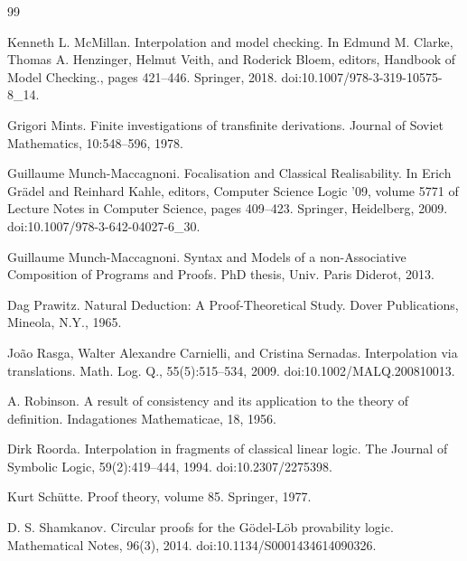 \begin{thebibliography}{99}
\par\noindent    Kenneth L. McMillan.  Interpolation and model checking.  In Edmund M. Clarke, Thomas A. Henzinger, Helmut Veith, and Roderick Bloem, editors, Handbook of Model Checking., pages 421–446. Springer, 2018.  doi:10.1007/978-3-319-10575-8\_14.  

\par\noindent    Grigori Mints.  Finite investigations of transfinite derivations.  Journal of Soviet Mathematics, 10:548–596, 1978.  

\par\noindent    Guillaume Munch-Maccagnoni.  Focalisation and Classical Realisability.  In Erich Grädel and Reinhard Kahle, editors, Computer Science Logic ’09, volume 5771 of Lecture Notes in Computer Science, pages 409–423. Springer, Heidelberg, 2009.  doi:10.1007/978-3-642-04027-6\_30.  

\par\noindent    Guillaume Munch-Maccagnoni.  Syntax and Models of a non-Associative Composition of Programs and Proofs.  PhD thesis, Univ. Paris Diderot, 2013.  

\par\noindent    Dag Prawitz.  Natural Deduction: A Proof-Theoretical Study.  Dover Publications, Mineola, N.Y., 1965.  

\par\noindent    João Rasga, Walter Alexandre Carnielli, and Cristina Sernadas.  Interpolation via translations.  Math. Log. Q., 55(5):515–534, 2009.  doi:10.1002/MALQ.200810013.  

\par\noindent    A. Robinson.  A result of consistency and its application to the theory of definition.  Indagationes Mathematicae, 18, 1956.  

\par\noindent    Dirk Roorda.  Interpolation in fragments of classical linear logic.  The Journal of Symbolic Logic, 59(2):419–444, 1994.  doi:10.2307/2275398.  

\par\noindent    Kurt Schütte.  Proof theory, volume 85.  Springer, 1977.  

\par\noindent    D. S. Shamkanov.  Circular proofs for the Gödel-Löb provability logic.  Mathematical Notes, 96(3), 2014.  doi:10.1134/S0001434614090326.  


\end{thebibliography}
